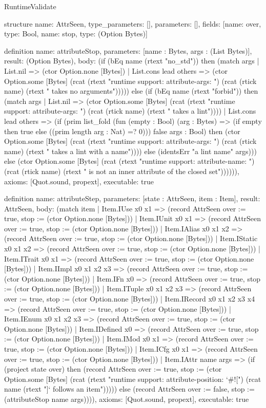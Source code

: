 \begin{lexlean}{RuntimeValidate}
\begin{semanticmodule}
structure{
  name: AttrSeen,
  type_parameters: [],
  parameters: [],
  fields: [{name: over, type: Bool}, {name: stop, type: (Option Bytes)}]
}

definition{
  name: attributeStop,
  parameters: [name : Bytes, args : (List Bytes)],
  result: (Option Bytes),
  body: (if (bEq name (rtext "no_std")) then (match args
    | List.nil => (ctor Option.none [Bytes])
    | List.cons lead others => (ctor Option.some [Bytes] (rcat (rtext "runtime support: attribute-args: ") (rcat (rtick name) (rtext " takes no arguments"))))) else (if (bEq name (rtext "forbid")) then (match args
    | List.nil => (ctor Option.some [Bytes] (rcat (rtext "runtime support: attribute-args: ") (rcat (rtick name) (rtext " takes a lint"))))
    | List.cons lead others => (if (prim list_fold (fun (empty : Bool) (arg : Bytes) => (if empty then true else ((prim length arg : Nat) =? 0))) false args : Bool) then (ctor Option.some [Bytes] (rcat (rtext "runtime support: attribute-args: ") (rcat (rtick name) (rtext " takes a lint with a name")))) else (identsErr "a lint name" args))) else (ctor Option.some [Bytes] (rcat (rtext "runtime support: attribute-name: ") (rcat (rtick name) (rtext " is not an inner attribute of the closed set")))))),
  axioms: [Quot.sound, propext],
  executable: true
}

definition{
  name: attributeStep,
  parameters: [state : AttrSeen, item : Item],
  result: AttrSeen,
  body: (match item
    | Item.IUse x0 x1 => (record AttrSeen {over := true, stop := (ctor Option.none [Bytes])})
    | Item.IUnit x0 x1 => (record AttrSeen {over := true, stop := (ctor Option.none [Bytes])})
    | Item.IAlias x0 x1 x2 => (record AttrSeen {over := true, stop := (ctor Option.none [Bytes])})
    | Item.IStatic x0 x1 x2 => (record AttrSeen {over := true, stop := (ctor Option.none [Bytes])})
    | Item.ITrait x0 x1 => (record AttrSeen {over := true, stop := (ctor Option.none [Bytes])})
    | Item.IImpl x0 x1 x2 x3 => (record AttrSeen {over := true, stop := (ctor Option.none [Bytes])})
    | Item.IFn x0 => (record AttrSeen {over := true, stop := (ctor Option.none [Bytes])})
    | Item.ITuple x0 x1 x2 x3 => (record AttrSeen {over := true, stop := (ctor Option.none [Bytes])})
    | Item.IRecord x0 x1 x2 x3 x4 => (record AttrSeen {over := true, stop := (ctor Option.none [Bytes])})
    | Item.IEnum x0 x1 x2 x3 => (record AttrSeen {over := true, stop := (ctor Option.none [Bytes])})
    | Item.IDefined x0 => (record AttrSeen {over := true, stop := (ctor Option.none [Bytes])})
    | Item.IMod x0 x1 => (record AttrSeen {over := true, stop := (ctor Option.none [Bytes])})
    | Item.ICfg x0 x1 => (record AttrSeen {over := true, stop := (ctor Option.none [Bytes])})
    | Item.IAttr name args => (if (project state over) then (record AttrSeen {over := true, stop := (ctor Option.some [Bytes] (rcat (rtext "runtime support: attribute-position: `#![") (rcat name (rtext "]` follows an item"))))}) else (record AttrSeen {over := false, stop := (attributeStop name args)}))),
  axioms: [Quot.sound, propext],
  executable: true
}


\end{semanticmodule}
\end{lexlean}

